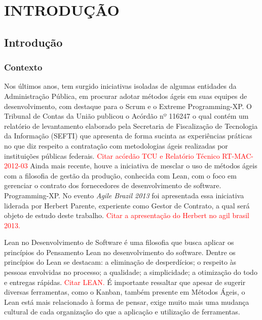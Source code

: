 \part{INTRODUÇÃO}

\chapter[Introdução]{Introdução}



\section[Contexto]{Contexto}

Nos últimos anos, tem surgido iniciativas isoladas de algumas entidades da Administração Pública, em procurar adotar métodos ágeis em suas equipes de desenvolvimento, com destaque para o Scrum e o Extreme Programming-XP.  O Tribunal de Contas da União publicou o Acórdão nº 116247 o qual contém um relatório de levantamento elaborado pela Secretaria de Fiscalização de Tecnologia da Informação (SEFTI) que apresenta de forma sucinta as experiências práticas no que diz respeito a contratação com metodologias ágeis realizadas por instituições públicas federais.
\textcolor{red}{{Citar acórdão TCU e Relatório Técnico RT-MAC-2012-03}}
Ainda mais recente, houve a iniciativa de mesclar o uso de métodos ágeis com a filosofia de gestão da produção, conhecida com Lean, com o foco em gerenciar o contrato dos fornecedores de desenvolvimento de software. Programming-XP. No evento \textit{Agile Brazil 2013} foi apresentada essa iniciativa liderada por Herbert Parente, experiente como Gestor de Contrato, a qual será objeto de estudo deste trabalho.
\textcolor{red}{{Citar a apresentação do Herbert no agil brasil 2013.}}

Lean no Desenvolvimento de Software é uma filosofia que busca aplicar os princípios do Pensamento Lean no desenvolvimento do software. Dentre os princípios do Lean se destacam: a eliminação de desperdícios; o respeito às pessoas envolvidas no processo; a qualidade; a simplicidade; a otimização do todo e entregas rápidas.
\textcolor{red}{{Citar LEAN.}}
É importante ressaltar que apesar de sugerir diversas ferramentas, como o Kanban, também presente em Métodos Ágeis, o Lean está mais relacionado à forma de pensar, exige muito mais uma mudança cultural de cada organização do que a aplicação e utilização de ferramentas. 


